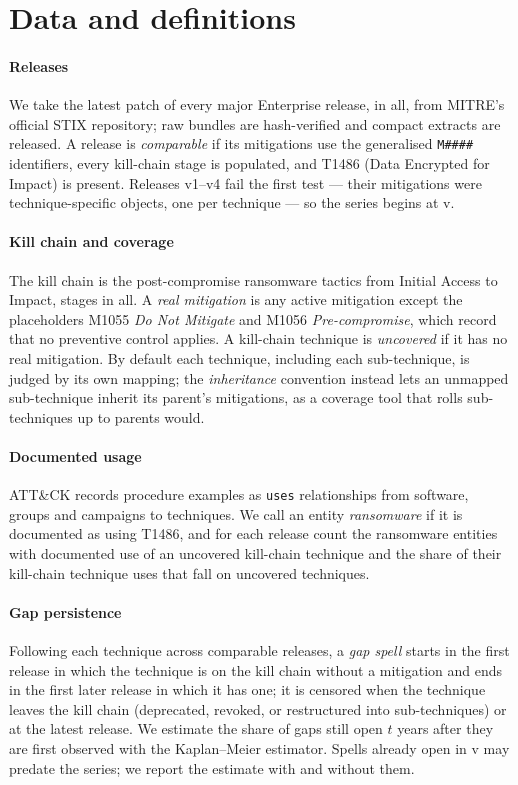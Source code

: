 \documentclass[conference,compsoc]{IEEEtran}
\begin{document}
\section{Data and definitions}
\paragraph{Releases} We take the latest patch of every major Enterprise release,
\GapReleases{} in all, from MITRE's official STIX repository; raw bundles are
hash-verified and compact extracts are released. A release is \emph{comparable} if its
mitigations use the generalised \texttt{M\#\#\#\#} identifiers, every kill-chain stage is
populated, and T1486 (Data Encrypted for Impact) is present. Releases v1--v4 fail the
first test --- their mitigations were technique-specific objects, one per technique ---
so the series begins at v\GapFirstVersion.

\paragraph{Kill chain and coverage} The kill chain is the post-compromise ransomware
tactics from Initial Access to Impact, \GapStages{} stages in all. A \emph{real
mitigation} is any active mitigation except the placeholders M1055 \emph{Do Not
Mitigate} and M1056 \emph{Pre-compromise}, which record that no preventive control
applies. A kill-chain technique is \emph{uncovered} if it has no real mitigation. By
default each technique, including each sub-technique, is judged by its own mapping; the
\emph{inheritance} convention instead lets an unmapped sub-technique inherit its parent's
mitigations, as a coverage tool that rolls sub-techniques up to parents would.

\paragraph{Documented usage} ATT\&CK records procedure examples as \texttt{uses}
relationships from software, groups and campaigns to techniques. We call an entity
\emph{ransomware} if it is documented as using T1486, and for each release count the
ransomware entities with documented use of an uncovered kill-chain technique and the
share of their kill-chain technique uses that fall on uncovered techniques.

\paragraph{Gap persistence} Following each technique across comparable releases, a
\emph{gap spell} starts in the first release in which the technique is on the kill chain
without a mitigation and ends in the first later release in which it has one; it is
censored when the technique leaves the kill chain (deprecated, revoked, or restructured
into sub-techniques) or at the latest release. We estimate the share of gaps still open
$t$ years after they are first observed with the Kaplan--Meier estimator. Spells already
open in v\GapFirstVersion{} may predate the series; we report the estimate with and
without them.
\end{document}
